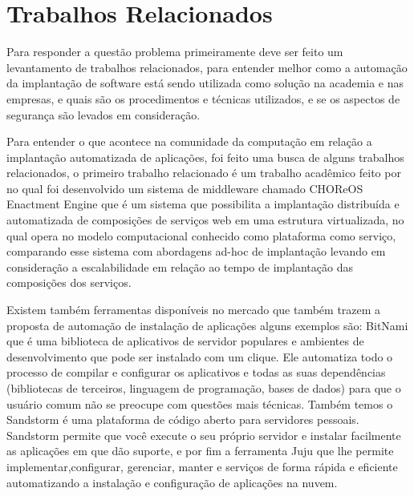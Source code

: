 \section{Trabalhos Relacionados}

Para responder a questão problema primeiramente deve ser feito um levantamento
de trabalhos relacionados, para entender melhor como a automação da implantação
de software está sendo utilizada como solução na academia e nas empresas, e
quais são os procedimentos e técnicas utilizados, e se os aspectos de segurança
são levados em consideração.

Para entender o que acontece na comunidade da computação em relação a implantação
automatizada de aplicações, foi feito uma busca de alguns trabalhos relacionados, o primeiro
trabalho relacionado é um trabalho acadêmico feito por \cite{leo2014} no qual foi
desenvolvido um sistema de middleware chamado CHOReOS Enactment Engine que é um
sistema que possibilita a implantação distribuída e automatizada de composições
de serviços web em uma estrutura virtualizada, no qual opera no modelo
computacional conhecido como plataforma como serviço, comparando esse sistema
com abordagens ad-hoc de implantação levando em consideração a escalabilidade
em relação ao tempo de implantação das composições dos serviços.

Existem também ferramentas disponíveis no mercado que também trazem a proposta
de automação de instalação de aplicações alguns exemplos são: \cite{bitnami}
BitNami que é uma biblioteca de aplicativos de servidor populares e ambientes de
desenvolvimento que pode ser instalado com um clique. Ele automatiza todo o
processo de compilar e configurar os aplicativos e todas as suas dependências
(bibliotecas de terceiros, linguagem de programação, bases de dados) para que o
usuário comum não se preocupe com questões mais técnicas. Também temos o
\cite{sandstormio} Sandstorm é uma plataforma de código aberto para servidores
pessoais. Sandstorm permite que você execute o seu próprio servidor e instalar
facilmente as aplicações em que dão suporte, e por fim a ferramenta \cite{juju}
Juju que lhe permite implementar,configurar, gerenciar, manter e serviços de forma
rápida e eficiente automatizando a instalação e configuração de aplicações na nuvem.

